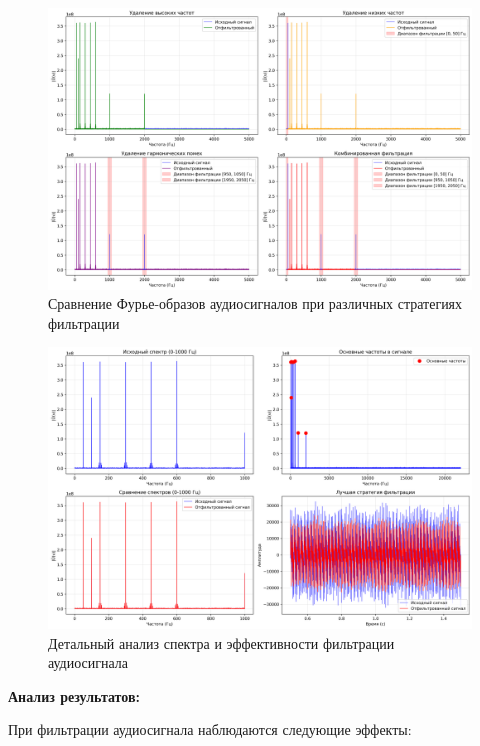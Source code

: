 \begin{figure}[H]
\centering
\includegraphics[width=\textwidth]{images/task2/audio_filter_freq_domain.png}
\caption{Сравнение Фурье-образов аудиосигналов при различных стратегиях фильтрации}
\end{figure}

\begin{figure}[H]
\centering
\includegraphics[width=\textwidth]{images/task2/audio_filter_analysis.png}
\caption{Детальный анализ спектра и эффективности фильтрации аудиосигнала}
\end{figure}

\textbf{Анализ результатов:}

При фильтрации аудиосигнала наблюдаются следующие эффекты:

